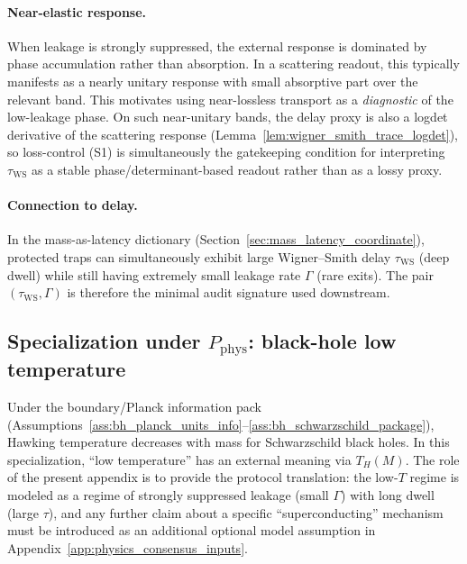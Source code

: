 \paragraph{Near-elastic response.}
\AuditTag When leakage is strongly suppressed, the external response is dominated by phase accumulation rather than absorption.
In a scattering readout, this typically manifests as a nearly unitary response with small absorptive part over the relevant band.
This motivates using near-lossless transport as a \emph{diagnostic} of the low-leakage phase.
\AuditTag On such near-unitary bands, the delay proxy is also a logdet derivative of the scattering response (Lemma~\ref{lem:wigner_smith_trace_logdet}), so loss-control (S1) is simultaneously the gatekeeping condition for interpreting $\tau_{\mathrm{WS}}$ as a stable phase/determinant-based readout rather than as a lossy proxy.

\paragraph{Connection to delay.}
\AuditTag In the mass-as-latency dictionary (Section~\ref{sec:mass_latency_coordinate}), protected traps can simultaneously exhibit large Wigner--Smith delay $\tau_{\mathrm{WS}}$ (deep dwell) while still having extremely small leakage rate $\Gamma$ (rare exits).
The pair $(\tau_{\mathrm{WS}},\Gamma)$ is therefore the minimal audit signature used downstream.

\subsection{Specialization under \texorpdfstring{$P_{\mathrm{phys}}$}{Pphys}: black-hole low temperature}
\label{subsec:pll_bh_specialization}

\AuditTag Under the boundary/Planck information pack (Assumptions~\ref{ass:bh_planck_units_info}--\ref{ass:bh_schwarzschild_package}), Hawking temperature decreases with mass for Schwarzschild black holes.
In this specialization, ``low temperature'' has an external meaning via $T_H(M)$.
The role of the present appendix is to provide the protocol translation: the low-$T$ regime is modeled as a regime of strongly suppressed leakage (small $\Gamma$) with long dwell (large $\tau$), and any further claim about a specific ``superconducting'' mechanism must be introduced as an additional optional model assumption in Appendix~\ref{app:physics_consensus_inputs}.

